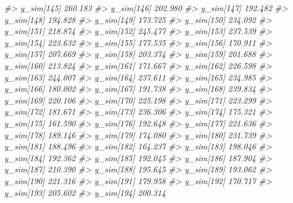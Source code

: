 \documentclass[
  10pt,
  italian,
  a4paper,
  extrafontsizes,onecolumn,openright
  ]{memoir}
\newenvironment{Shaded}{\begin{snugshade}}{\end{snugshade}}
\newcommand{\CommentTok}[1]{\textcolor[rgb]{0.56,0.35,0.01}{\textit{#1}}}
\begin{document}
\begin{Shaded}
\begin{Highlighting}[]
\CommentTok{\#\textgreater{}   y\_sim[145] 260.183}
\CommentTok{\#\textgreater{}   y\_sim[146] 202.980}
\CommentTok{\#\textgreater{}   y\_sim[147] 192.482}
\CommentTok{\#\textgreater{}   y\_sim[148] 194.828}
\CommentTok{\#\textgreater{}   y\_sim[149] 173.725}
\CommentTok{\#\textgreater{}   y\_sim[150] 234.092}
\CommentTok{\#\textgreater{}   y\_sim[151] 218.874}
\CommentTok{\#\textgreater{}   y\_sim[152] 245.477}
\CommentTok{\#\textgreater{}   y\_sim[153] 237.539}
\CommentTok{\#\textgreater{}   y\_sim[154] 223.632}
\CommentTok{\#\textgreater{}   y\_sim[155] 177.535}
\CommentTok{\#\textgreater{}   y\_sim[156] 170.911}
\CommentTok{\#\textgreater{}   y\_sim[157] 207.669}
\CommentTok{\#\textgreater{}   y\_sim[158] 203.374}
\CommentTok{\#\textgreater{}   y\_sim[159] 201.688}
\CommentTok{\#\textgreater{}   y\_sim[160] 213.824}
\CommentTok{\#\textgreater{}   y\_sim[161] 171.667}
\CommentTok{\#\textgreater{}   y\_sim[162] 226.598}
\CommentTok{\#\textgreater{}   y\_sim[163] 244.007}
\CommentTok{\#\textgreater{}   y\_sim[164] 237.611}
\CommentTok{\#\textgreater{}   y\_sim[165] 234.985}
\CommentTok{\#\textgreater{}   y\_sim[166] 180.002}
\CommentTok{\#\textgreater{}   y\_sim[167] 191.738}
\CommentTok{\#\textgreater{}   y\_sim[168] 239.834}
\CommentTok{\#\textgreater{}   y\_sim[169] 220.106}
\CommentTok{\#\textgreater{}   y\_sim[170] 225.198}
\CommentTok{\#\textgreater{}   y\_sim[171] 223.299}
\CommentTok{\#\textgreater{}   y\_sim[172] 181.671}
\CommentTok{\#\textgreater{}   y\_sim[173] 236.306}
\CommentTok{\#\textgreater{}   y\_sim[174] 175.321}
\CommentTok{\#\textgreater{}   y\_sim[175] 161.590}
\CommentTok{\#\textgreater{}   y\_sim[176] 192.648}
\CommentTok{\#\textgreater{}   y\_sim[177] 221.636}
\CommentTok{\#\textgreater{}   y\_sim[178] 189.146}
\CommentTok{\#\textgreater{}   y\_sim[179] 174.080}
\CommentTok{\#\textgreater{}   y\_sim[180] 231.739}
\CommentTok{\#\textgreater{}   y\_sim[181] 188.496}
\CommentTok{\#\textgreater{}   y\_sim[182] 164.237}
\CommentTok{\#\textgreater{}   y\_sim[183] 198.046}
\CommentTok{\#\textgreater{}   y\_sim[184] 192.362}
\CommentTok{\#\textgreater{}   y\_sim[185] 192.045}
\CommentTok{\#\textgreater{}   y\_sim[186] 187.904}
\CommentTok{\#\textgreater{}   y\_sim[187] 210.390}
\CommentTok{\#\textgreater{}   y\_sim[188] 195.645}
\CommentTok{\#\textgreater{}   y\_sim[189] 193.062}
\CommentTok{\#\textgreater{}   y\_sim[190] 221.316}
\CommentTok{\#\textgreater{}   y\_sim[191] 179.958}
\CommentTok{\#\textgreater{}   y\_sim[192] 170.717}
\CommentTok{\#\textgreater{}   y\_sim[193] 205.602}
\CommentTok{\#\textgreater{}   y\_sim[194] 200.314}

\end{Highlighting}
\end{Shaded}
\end{document}
